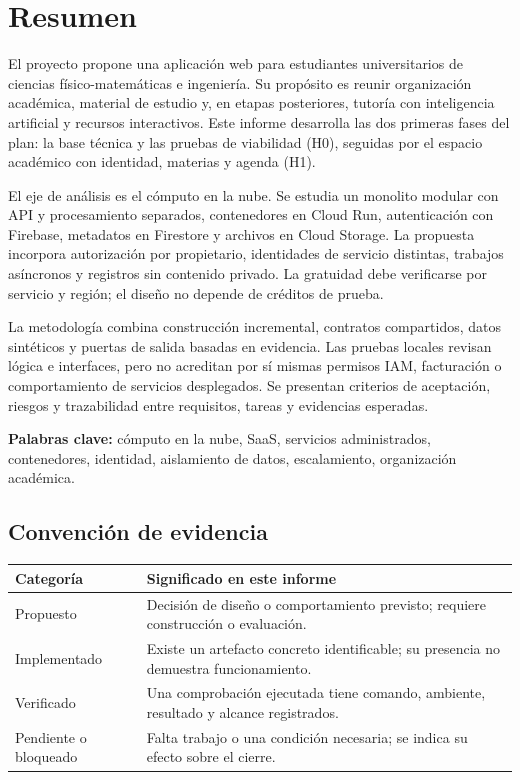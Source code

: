 \section*{Resumen}
El proyecto propone una aplicación web para estudiantes universitarios de ciencias físico-matemáticas e ingeniería. Su propósito es reunir organización académica, material de estudio y, en etapas posteriores, tutoría con inteligencia artificial y recursos interactivos. Este informe desarrolla las dos primeras fases del plan: la base técnica y las pruebas de viabilidad (H0), seguidas por el espacio académico con identidad, materias y agenda (H1).

El eje de análisis es el cómputo en la nube. Se estudia un monolito modular con API y procesamiento separados, contenedores en Cloud Run, autenticación con Firebase, metadatos en Firestore y archivos en Cloud Storage. La propuesta incorpora autorización por propietario, identidades de servicio distintas, trabajos asíncronos y registros sin contenido privado. La gratuidad debe verificarse por servicio y región; el diseño no depende de créditos de prueba.

La metodología combina construcción incremental, contratos compartidos, datos sintéticos y puertas de salida basadas en evidencia. Las pruebas locales revisan lógica e interfaces, pero no acreditan por sí mismas permisos IAM, facturación o comportamiento de servicios desplegados. Se presentan criterios de aceptación, riesgos y trazabilidad entre requisitos, tareas y evidencias esperadas.


\textbf{Palabras clave:} cómputo en la nube, SaaS, servicios administrados, contenedores, identidad, aislamiento de datos, escalamiento, organización académica.

\subsection*{Convención de evidencia}
\begin{tabularx}{\linewidth}{P{3.4cm}Y}
\toprule
\textbf{Categoría} & \textbf{Significado en este informe}\\
\midrule
Propuesto & Decisión de diseño o comportamiento previsto; requiere construcción o evaluación.\\
Implementado & Existe un artefacto concreto identificable; su presencia no demuestra funcionamiento.\\
Verificado & Una comprobación ejecutada tiene comando, ambiente, resultado y alcance registrados.\\
Pendiente o bloqueado & Falta trabajo o una condición necesaria; se indica su efecto sobre el cierre.\\
\bottomrule
\end{tabularx}
